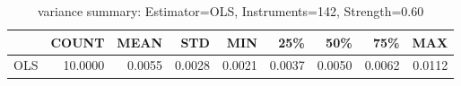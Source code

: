\begin{table}[ht]
\centering
\caption{variance summary: Estimator=OLS, Instruments=142, Strength=0.60}
\begin{tabular}{lrrrrrrrr}
\toprule
 & COUNT & MEAN & STD & MIN & 25\% & 50\% & 75\% & MAX \\
\midrule
OLS & 10.0000 & 0.0055 & 0.0028 & 0.0021 & 0.0037 & 0.0050 & 0.0062 & 0.0112 \\
\bottomrule
\end{tabular}
\end{table}
